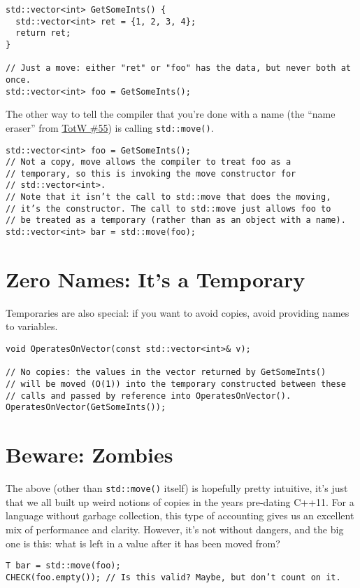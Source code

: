 \begin{verbatim}
std::vector<int> GetSomeInts() {
  std::vector<int> ret = {1, 2, 3, 4};
  return ret;
}

// Just a move: either "ret" or "foo" has the data, but never both at once.
std::vector<int> foo = GetSomeInts();
\end{verbatim}
The other way to tell the compiler that you’re done with a name (the \enquote{name eraser} from \hyperref[ch:tip-of-the-week-55]{TotW \#55}) is calling \texttt{std::move()}.

\begin{verbatim}
std::vector<int> foo = GetSomeInts();
// Not a copy, move allows the compiler to treat foo as a
// temporary, so this is invoking the move constructor for
// std::vector<int>.
// Note that it isn’t the call to std::move that does the moving,
// it’s the constructor. The call to std::move just allows foo to
// be treated as a temporary (rather than as an object with a name).
std::vector<int> bar = std::move(foo);
\end{verbatim}

\section{Zero Names: It’s a Temporary}
Temporaries are also special: if you want to avoid copies, avoid providing names to variables.
\begin{verbatim}
void OperatesOnVector(const std::vector<int>& v);

// No copies: the values in the vector returned by GetSomeInts()
// will be moved (O(1)) into the temporary constructed between these
// calls and passed by reference into OperatesOnVector().
OperatesOnVector(GetSomeInts());
\end{verbatim}

\section{Beware: Zombies}
The above (other than \texttt{std::move()} itself) is hopefully pretty intuitive, it’s just that we all built up weird notions of copies in the years pre-dating C++11. For a language without garbage collection, this type of accounting gives us an excellent mix of performance and clarity. However, it’s not without dangers, and the big one is this: what is left in a value after it has been moved from?

\begin{verbatim}
T bar = std::move(foo);
CHECK(foo.empty()); // Is this valid? Maybe, but don’t count on it.
\end{verbatim}

